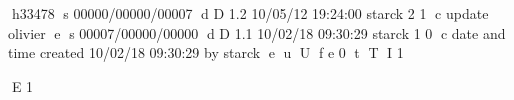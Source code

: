h33478
s 00000/00000/00007
d D 1.2 10/05/12 19:24:00 starck 2 1
c update olivier
e
s 00007/00000/00000
d D 1.1 10/02/18 09:30:29 starck 1 0
c date and time created 10/02/18 09:30:29 by starck
e
u
U
f e 0
t
T
I 1

%  
% 
%
\markboth{$ $}{$ $}
% 


E 1
